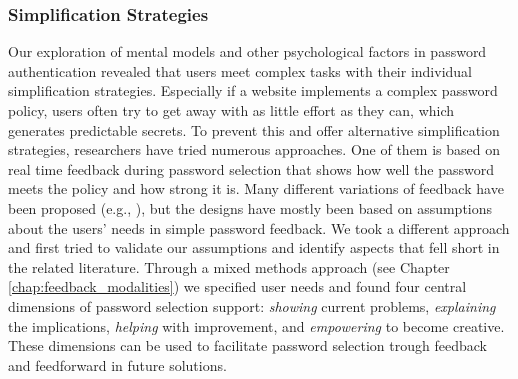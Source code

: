 \subsubsection{Simplification Strategies}
Our exploration of mental models and other psychological factors in password authentication revealed that users meet complex tasks with their individual simplification strategies. Especially if a website implements a complex password policy, users often try to get away with as little effort as they can, which generates predictable secrets. To prevent this and offer alternative simplification strategies, researchers have tried numerous approaches. One of them is based on real time feedback during password selection that shows how well the password meets the policy and how strong it is. Many different variations of feedback have been proposed (e.g., \cite{Egelman2013DoesMyPasswordGoUpToEleven,Habib2017Blacklists,Shay2015SpoonfulOfSugar,Ur2012HowDoesYourPasswordMeasureUp, Vance2013FearAppeals}), but the designs have mostly been based on assumptions about the users' needs in simple password feedback. 
We took a different approach and first tried to validate our assumptions and identify aspects that fell short in the related literature. Through a mixed methods approach (see Chapter \ref{chap:feedback_modalities}) we specified user needs and found four central dimensions of password selection support: \textit{showing} current problems, \textit{explaining} the implications, \textit{helping} with improvement, and \textit{empowering} to become creative. These dimensions can be used to facilitate password selection trough feedback and feedforward in future solutions. 

